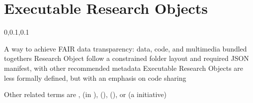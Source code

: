 
\section{Executable Research Objects}\fbeg{}\begin{frame}{}


\vspace{-.5em}	

{\Large{}\selectfont

\hspace*{20pt}\begin{minipage}{.96\textwidth}
\vspace{4pt}
		
\begin{lightquadblockc}{0,0.1,0.1}{\parbox{21cm}{\centering \vspace{3pt}}}
\begin{center}\begin{minipage}{\textwidth}
{\Huge \setlength{\leftmargini}{30pt}\begin{enumerate}
\dmitem {\dsp} A way to achieve FAIR data transparency: data, code, and multimedia bundled togethers
\vspace{20pt}
\dmitem {\dsp} Research Object  follow a constrained folder layout and required JSON manifest, 
with other recommended metadata
\vspace{20pt}
\dmitem {\dsp} Executable Research Objects are less formally defined, but with an emphasis on code sharing
\vspace{20pt}
\end{enumerate}
}\end{minipage}
\end{center}
\end{lightquadblockc}
\end{minipage}

}

\vspace{-11pt}
{\thrule}
\hspace{32pt}\begin{minipage}{.8\textwidth}
{\fontsize{22}{28}\selectfont \setlength{\leftmargini}{3pt}
Other related terms are ,
 (in ),  (),
 (), or 
 (a  initiative)

}
\end{minipage}

\end{frame}


